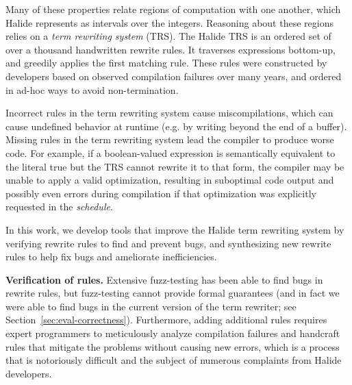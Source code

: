\documentclass[acmsmall,review,anonymous]{acmart}\settopmatter{printfolios=true,printccs=false,printacmref=false}
\begin{document}
Many of these properties relate regions of computation with one
another, which Halide represents as intervals over the integers.
Reasoning about these regions relies on a \textit{term rewriting
  system} (TRS). The Halide TRS is an ordered set of over a thousand
handwritten rewrite rules. It traverses expressions bottom-up, and
greedily applies the first matching rule. These rules were constructed
by developers based on observed compilation failures over many years,
and ordered in ad-hoc ways to avoid non-termination.

Incorrect rules in the term rewriting system cause miscompilations,
which can cause undefined behavior at runtime (e.g. by writing beyond
the end of a buffer). Missing rules in the term rewriting system lead
the compiler to produce worse code. For example, if a boolean-valued
expression is semantically equivalent to the literal true but the TRS
cannot rewrite it to that form, the compiler may be unable to apply a
valid optimization, resulting in suboptimal code output and possibly
even errors during compilation if that optimization was explicitly
requested in the \textit{schedule}.

In this work, we develop tools that improve the Halide term rewriting
system by verifying rewrite rules to find and prevent bugs, and
synthesizing new rewrite rules to help fix bugs and ameliorate
inefficiencies.

\textbf{Verification of rules.}
Extensive
fuzz-testing has been able to find bugs in rewrite rules, but fuzz-testing
cannot provide formal guarantees (and in fact we were able to find bugs in the
current version of the term rewriter; see Section~\ref{sec:eval-correctness}).
Furthermore, adding additional rules requires expert programmers to meticulously
analyze compilation failures and handcraft rules that mitigate the problems
without causing new errors, which is a process that is notoriously difficult and
the subject of numerous complaints from Halide developers.


%
\end{document}
